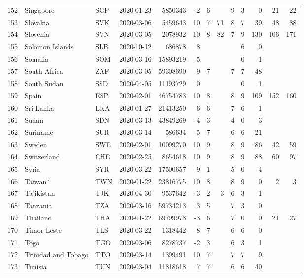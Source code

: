 \begin{longtable}{rlllrrrrrrrrr}
  152 & Singapore & SGP & 2020-01-23 & 5850343 & -2 & 6 &  & 9 & 3 & 0 & 21 & 22 \\ 
  153 & Slovakia & SVK & 2020-03-06 & 5459643 & 10 & 7 & 71 & 8 & 7 & 39 & 48 & 88 \\ 
  154 & Slovenia & SVN & 2020-03-05 & 2078932 & 10 & 8 & 82 & 7 & 9 & 130 & 106 & 171 \\ 
  155 & Solomon Islands & SLB & 2020-10-12 & 686878 & 8 &  &  &  & 6 & 0 &  &  \\ 
  156 & Somalia & SOM & 2020-03-16 & 15893219 & 5 &  &  &  & 0 & 1 &  &  \\ 
  157 & South Africa & ZAF & 2020-03-05 & 59308690 & 9 & 7 &  & 7 & 7 & 48 &  &  \\ 
  158 & South Sudan & SSD & 2020-04-05 & 11193729 & 0 &  &  &  & 0 & 1 &  &  \\ 
  159 & Spain & ESP & 2020-02-01 & 46754783 & 10 & 8 &  & 8 & 9 & 109 & 152 & 160 \\ 
  160 & Sri Lanka & LKA & 2020-01-27 & 21413250 & 6 & 6 &  & 7 & 6 & 1 &  &  \\ 
  161 & Sudan & SDN & 2020-03-13 & 43849269 & -4 & 3 &  & 4 & 0 & 3 &  &  \\ 
  162 & Suriname & SUR & 2020-03-14 & 586634 & 5 & 7 &  & 6 & 6 & 21 &  &  \\ 
  163 & Sweden & SWE & 2020-02-01 & 10099270 & 10 & 9 &  & 8 & 9 & 86 & 42 & 59 \\ 
  164 & Switzerland & CHE & 2020-02-25 & 8654618 & 10 & 9 &  & 8 & 9 & 88 & 60 & 97 \\ 
  165 & Syria & SYR & 2020-03-22 & 17500657 & -9 & 1 &  & 5 & 0 & 4 &  &  \\ 
  166 & Taiwan* & TWN & 2020-01-22 & 23816775 & 10 & 8 &  & 8 & 9 & 0 & 2 & 3 \\ 
  167 & Tajikistan & TJK & 2020-04-30 & 9537642 & -3 & 2 & 3 & 6 & 3 & 1 &  &  \\ 
  168 & Tanzania & TZA & 2020-03-16 & 59734213 & 3 & 5 &  & 7 & 3 & 0 &  &  \\ 
  169 & Thailand & THA & 2020-01-22 & 69799978 & -3 & 6 &  & 7 & 0 & 0 & 21 & 27 \\ 
  170 & Timor-Leste & TLS & 2020-03-22 & 1318442 & 8 & 7 &  & 6 & 6 & 0 &  &  \\ 
  171 & Togo & TGO & 2020-03-06 & 8278737 & -2 & 3 &  & 6 & 3 & 1 &  &  \\ 
  172 & Trinidad and Tobago & TTO & 2020-03-14 & 1399491 & 10 & 7 &  & 7 & 7 & 9 &  &  \\ 
  173 & Tunisia & TUN & 2020-03-04 & 11818618 & 7 & 7 &  & 6 & 6 & 40 &  &  \\ 

\end{longtable}
